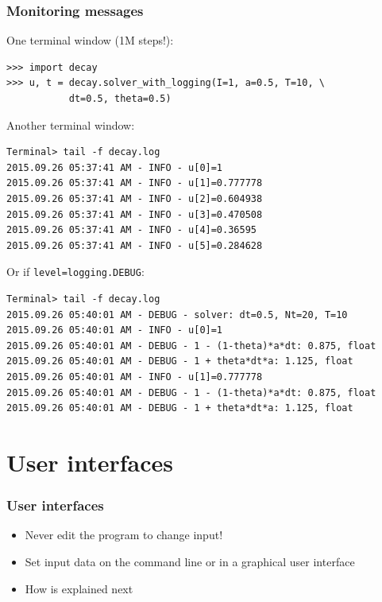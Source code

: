 \documentclass{beamer}
\begin{document}
\begin{frame}
\frametitle{Monitoring messages}

One terminal window (1M steps!):

\begin{verbatim}
>>> import decay
>>> u, t = decay.solver_with_logging(I=1, a=0.5, T=10, \ 
           dt=0.5, theta=0.5)
\end{verbatim}

Another terminal window:

\begin{verbatim}
Terminal> tail -f decay.log
2015.09.26 05:37:41 AM - INFO - u[0]=1
2015.09.26 05:37:41 AM - INFO - u[1]=0.777778
2015.09.26 05:37:41 AM - INFO - u[2]=0.604938
2015.09.26 05:37:41 AM - INFO - u[3]=0.470508
2015.09.26 05:37:41 AM - INFO - u[4]=0.36595
2015.09.26 05:37:41 AM - INFO - u[5]=0.284628
\end{verbatim}

Or if \texttt{level=logging.DEBUG}:

\begin{verbatim}
Terminal> tail -f decay.log
2015.09.26 05:40:01 AM - DEBUG - solver: dt=0.5, Nt=20, T=10
2015.09.26 05:40:01 AM - INFO - u[0]=1
2015.09.26 05:40:01 AM - DEBUG - 1 - (1-theta)*a*dt: 0.875, float
2015.09.26 05:40:01 AM - DEBUG - 1 + theta*dt*a: 1.125, float
2015.09.26 05:40:01 AM - INFO - u[1]=0.777778
2015.09.26 05:40:01 AM - DEBUG - 1 - (1-theta)*a*dt: 0.875, float
2015.09.26 05:40:01 AM - DEBUG - 1 + theta*dt*a: 1.125, float
\end{verbatim}
\end{frame}

\section{User interfaces}

\begin{frame}
\frametitle{User interfaces}

\label{decay:GUI}

\begin{itemize}
 \item Never edit the program to change input!

 \item Set input data on the command line or in a graphical user interface

 \item How is explained next
\end{itemize}

\noindent

\end{frame}
\end{document}
